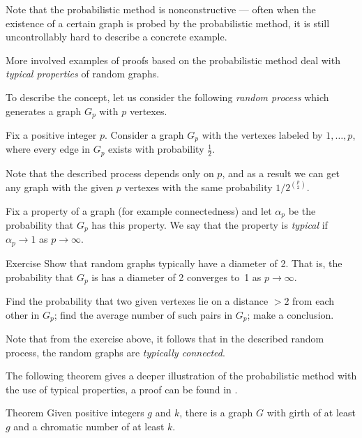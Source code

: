 Note that the probabilistic method is nonconstructive ---
often when the existence of a certain graph is probed by the probabilistic method,
it is still uncontrollably hard to describe a concrete example.

More involved examples of proofs based on the probabilistic method deal with {}\emph{typical properties} of random graphs.

To describe the concept, let us consider the following {}\emph{random process} which generates a graph $G_p$ with $p$ vertexes.

Fix a positive integer $p$. 
Consider a graph $G_p$ with the vertexes labeled by $1,\dots,p$,
where every edge in $G_p$ exists with probability $\tfrac12$.

Note that the described process depends only on $p$, and as a result we can get any graph with the given $p$ vertexes with the same probability $1/2^{\binom{p}{2}}$.

Fix a property of a graph (for example connectedness)
and let $\alpha_p$ be the probability that $G_p$ has this property.
We say that the property is \emph{typical} if $\alpha_p\to 1$ as $p\to \infty$.

\begin{thm}{Exercise}
Show that random graphs typically have a diameter of 2.
That is, the probability that $G_p$ is has a diameter of 2 converges to~1 as $p\to \infty$.
\end{thm}

 Find the probability that two given vertexes lie on a distance $>2$ from each other in $G_p$; find the average number of such pairs in $G_p$; make a conclusion.

\medskip

Note that from the exercise above, it follows that in the described random process, the random graphs are {}\emph{typically connected}.

The following theorem gives a deeper illustration of the probabilistic method with the use of typical properties,
a proof can be found in \cite[Chapter 44]{aigner-ziegler}.

\begin{thm}{Theorem}
Given positive integers $g$ and $k$, there is a graph $G$ with girth of at least $g$ and a chromatic number of at least $k$.
\end{thm}
